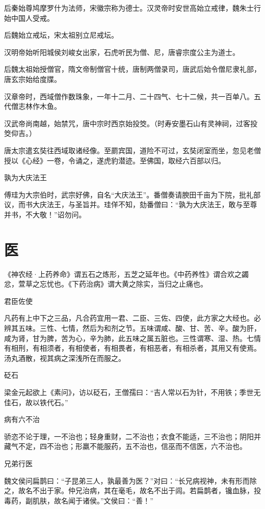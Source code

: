 \documentclass[a4paper,12pt,UTF8,twoside]{ctexbook}
\begin{document}
    后秦始尊鸠摩罗什为法师，宋徽宗称为德士。汉灵帝时安世高始立戒律，魏朱士行始中国人受戒。
    
    后魏始立戒坛，宋太祖别立尼戒坛。
    
    汉明帝始听阳城侯刘峻女出家，石虎听民为僧、尼，唐睿宗度公主为道士。
    
    后魏太祖始授僧官，隋文帝制僧官十统，唐制两僧录司，唐武后始令僧尼隶礼部，唐玄宗始给度牒。
    
    汉章帝时，西域僧作数珠象，一年十二月、二十四气、七十二候，共一百单八。五代僧志林作木鱼。
    
    汉武帝尚南越，始禁咒，唐中宗时西京始投筊。（时寿安墨石山有灵神祠，过客投筊仰吉。）
    
    唐太宗遣玄奘往西域取诸经像。至罽宾国，道险不可过，玄奘闭室而坐，忽见老僧授以《心经》一卷，令诵之，遂虎豹潜迹。至佛国，取经六百部以归。
    
    孰为大庆法王
    
    傅珪为大宗伯时，武宗好佛，自名“大庆法王”。番僧奏请腴田千亩为下院，批礼部议，而书大庆法王，与圣旨并。珪佯不知，劾番僧曰：“孰为大庆法王，敢与至尊并书，不大敬！”诏勿问。
    
    \chapter{医}
    
    《神农经·上药养命》谓五石之炼形，五芝之延年也。《中药养性》谓合欢之蠲忿，萱草之忘忧也。《下药治病》谓大黄之除实，当归之止痛也。
    
    君臣佐使
    
    凡药有上中下之三品，凡合药宜用一君、二臣、三佐、四使，此方家之大经也。必辨其五味。三性、七情，然后为和剂之节。五味谓咸、酸、甘、苦、辛。酸为肝，咸为肾，甘为脾，苦为心，辛为肺，此五味之属五脏也。三性谓寒、湿、热。七情有相刑，有相须者，有相使者，有相畏者，有相恶者，有相杀者，其用又有使焉。汤丸酒散，视其病之深浅所在而服之。
    
    砭石
    
    梁金元起欲上《素问》，访以砭石，王僧孺曰：“吉人常以石为针，不用铁；季世无佳石，故以铁代石。”
    
    病有六不治
    
    骄恣不论于理，一不治也；轻身重财，二不治也；衣食不能适，三不治也；阴阳并藏气不定，四不治也；形羸不能服药，五不治也，信巫而不信医，六不治也。
    
    兄弟行医
    
    魏文侯问扁鹊曰：“子昆弟三人，孰最善为医？”对曰：“长兄病视神，未有形而除之，故名不出于家。仲兄治病，其在毫毛，故名不出于闾。若扁鹊者，镵血脉，投毒药，副肌肤，故名闻于诸侯。”文侯曰：“善！”
    
\end{document}
